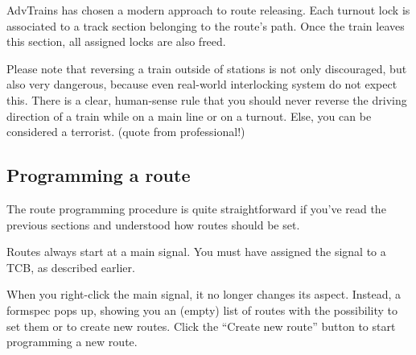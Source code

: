 \documentclass[english]{paper}
\begin{document}
AdvTrains has chosen a modern approach to route releasing. Each turnout
lock is associated to a track section belonging to the route's path.
Once the train leaves this section, all assigned locks are also freed.

Please note that reversing a train outside of stations is not only
discouraged, but also very dangerous, because even real-world interlocking
system do not expect this. There is a clear, human-sense rule that
you should never reverse the driving direction of a train while on
a main line or on a turnout. Else, you can be considered a terrorist.
(quote from professional!)

\subsection{Programming a route}

The route programming procedure is quite straightforward if you've
read the previous sections and understood how routes should be set.

Routes always start at a main signal. You must have assigned the signal
to a TCB, as described earlier.

When you right-click the main signal, it no longer changes its aspect.
Instead, a formspec pops up, showing you an (empty) list of routes
with the possibility to set them or to create new routes. Click the
``Create new route'' button to start programming a new route.
\end{document}
